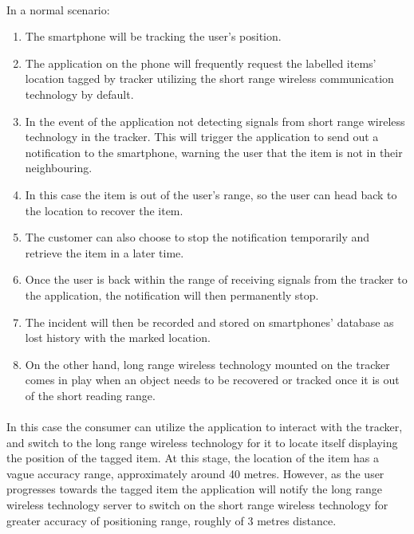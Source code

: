 \documentclass[12pt,a4paper]{article}
\begin{document}
      \paragraph{}
        In a normal scenario:
        \begin{enumerate}  
          \item The smartphone will be tracking the user’s position.
          \item The application on the phone will frequently request the labelled items’ location tagged by tracker utilizing the short range wireless communication technology by default.
          \item In the event of the application not detecting signals from short range wireless technology in the tracker. This will trigger the application to send out a notification to the smartphone, warning the user that the item is not in their neighbouring.
          \item In this case the item is out of the user’s range, so the user can head back to the location to recover the item.
          \item The customer can also choose to stop the notification temporarily and retrieve the item in a later time.
          \item Once the user is back within the range of receiving signals from the tracker to the application, the notification will then permanently stop.
          \item The incident will then be recorded and stored on smartphones’ database as lost history with the marked location.
          \item On the other hand, long range wireless technology mounted on the tracker comes in play when an object needs to be recovered or tracked once it is out of the short reading range.
        \end{enumerate}  
      \paragraph{}
      In this case the consumer can utilize the application to interact with the tracker, and switch to the long range wireless technology for it to locate itself displaying the position of the tagged item. At this stage, the location of the item has a vague accuracy range, approximately around 40 metres. However, as the user progresses towards the tagged item the application will notify the long range wireless technology server to switch on the short range wireless technology for greater accuracy of positioning range, roughly of 3 metres distance.
\end{document}

